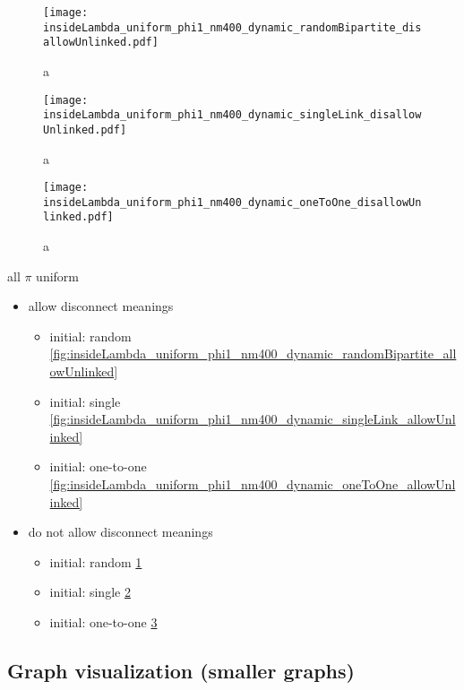\begin{figure}
  \centering
  \texttt{[image: insideLambda\_uniform\_phi1\_nm400\_dynamic\_randomBipartite\_disallowUnlinked.pdf]}
  \caption{a}
  \label{fig:insideLambda_uniform_phi1_nm400_dynamic_randomBipartite_disallowUnlinked}
\end{figure}

\begin{figure}
  \centering
  \texttt{[image: insideLambda\_uniform\_phi1\_nm400\_dynamic\_singleLink\_disallowUnlinked.pdf]}
  \caption{a}
  \label{fig:insideLambda_uniform_phi1_nm400_dynamic_singleLink_disallowUnlinked}
\end{figure}

\begin{figure}
  \centering
  \texttt{[image: insideLambda\_uniform\_phi1\_nm400\_dynamic\_oneToOne\_disallowUnlinked.pdf]}
  \caption{a}
  \label{fig:insideLambda_uniform_phi1_nm400_dynamic_oneToOne_disallowUnlinked}
\end{figure}

all $\pi$ uniform

\begin{itemize}
\item allow disconnect meanings
  \begin{itemize}
  \item initial: random \ref{fig:insideLambda_uniform_phi1_nm400_dynamic_randomBipartite_allowUnlinked}
  \item initial: single \ref{fig:insideLambda_uniform_phi1_nm400_dynamic_singleLink_allowUnlinked}
  \item initial: one-to-one \ref{fig:insideLambda_uniform_phi1_nm400_dynamic_oneToOne_allowUnlinked}
  \end{itemize}
\item do not allow disconnect meanings
  \begin{itemize}
  \item initial: random \ref{fig:insideLambda_uniform_phi1_nm400_dynamic_randomBipartite_disallowUnlinked}
  \item initial: single \ref{fig:insideLambda_uniform_phi1_nm400_dynamic_singleLink_disallowUnlinked}
  \item initial: one-to-one \ref{fig:insideLambda_uniform_phi1_nm400_dynamic_oneToOne_disallowUnlinked}
  \end{itemize}
\end{itemize}

\subsection{Graph visualization (smaller graphs)}

